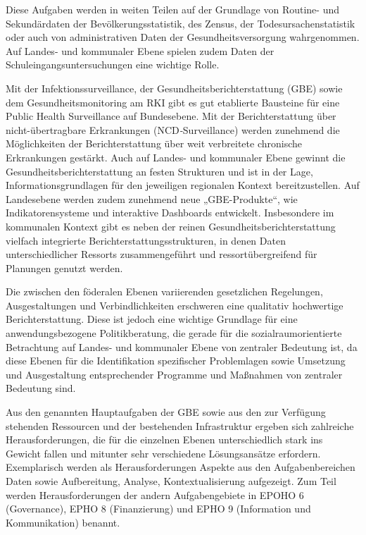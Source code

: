 \documentclass{article}
\begin{document}
Diese Aufgaben werden in weiten Teilen auf der Grundlage von Routine- und Sekundärdaten der Bevölkerungsstatistik, des Zensus, der Todesursachenstatistik oder auch von administrativen Daten der Gesundheitsversorgung wahrgenommen. Auf Landes- und kommunaler Ebene spielen zudem Daten der Schuleingangsuntersuchungen eine wichtige Rolle.


Mit der Infektionssurveillance, der Gesundheitsberichterstattung (GBE) sowie dem Gesundheitsmonitoring am RKI gibt es gut etablierte Bausteine für eine Public Health Surveillance auf Bundesebene. Mit der Berichterstattung über nicht-übertragbare Erkrankungen (NCD\emph{-}Surveillance) werden zunehmend die Möglichkeiten der Berichterstattung über weit verbreitete chronische Erkrankungen gestärkt. Auch auf Landes- und kommunaler Ebene gewinnt die Gesundheitsberichterstattung an festen Strukturen und ist in der Lage, Informationsgrundlagen für den jeweiligen regionalen Kontext bereitzustellen. Auf Landesebene werden zudem zunehmend neue „GBE-Produkte“, wie Indikatorensysteme und interaktive Dashboards entwickelt. Insbesondere im kommunalen Kontext gibt es neben der reinen Gesundheitsberichterstattung vielfach integrierte Berichterstattungsstrukturen, in denen Daten unterschiedlicher Ressorts zusammengeführt und ressortübergreifend für Planungen genutzt werden.


Die zwischen den föderalen Ebenen variierenden gesetzlichen Regelungen, Ausgestaltungen und Verbindlichkeiten erschweren eine qualitativ hochwertige Berichterstattung. Diese ist jedoch eine wichtige Grundlage für eine anwendungsbezogene Politikberatung, die gerade für die sozialraumorientierte Betrachtung auf Landes- und kommunaler Ebene von zentraler Bedeutung ist, da diese Ebenen für die Identifikation spezifischer Problemlagen sowie Umsetzung und Ausgestaltung entsprechender Programme und Maßnahmen von zentraler Bedeutung sind.


Aus den genannten Hauptaufgaben der GBE sowie aus den zur Verfügung stehenden Ressourcen und der bestehenden Infrastruktur ergeben sich zahlreiche Herausforderungen, die für die einzelnen Ebenen unterschiedlich stark ins Gewicht fallen und mitunter sehr verschiedene Lösungsansätze erfordern. Exemplarisch werden als Herausforderungen Aspekte aus den Aufgabenbereichen Daten sowie Aufbereitung, Analyse, Kontextualisierung aufgezeigt. Zum Teil werden Herausforderungen der andern Aufgabengebiete in EPOHO 6 (Governance), EPHO 8 (Finanzierung) und EPHO 9 (Information und Kommunikation) benannt.
\end{document}
